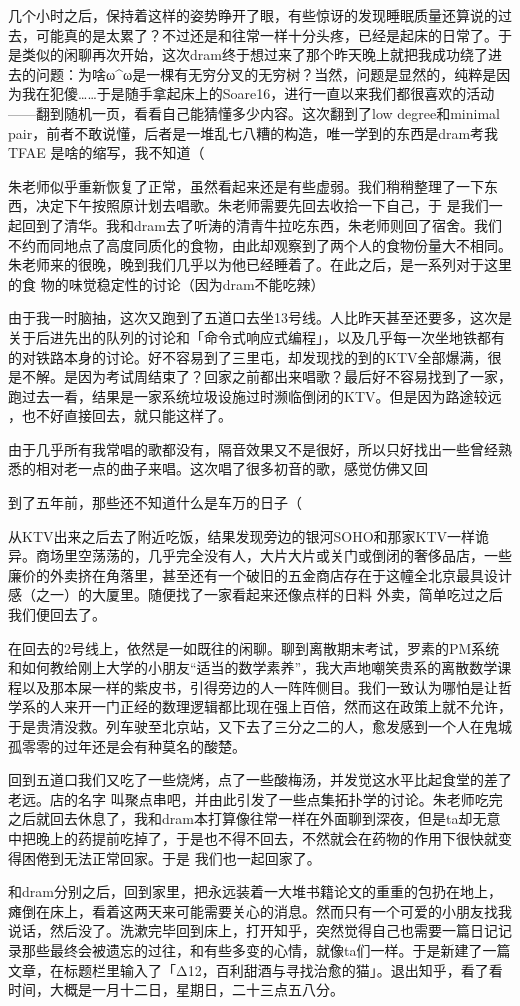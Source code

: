 \documentclass{article}
\begin{document}
几个小时之后，保持着这样的姿势睁开了眼，有些惊讶的发现睡眠质量还算说的过去，可能真的是太累了？不过还是和往常一样十分头疼，已经是起床的日常了。于是类似的闲聊再次开始，这次dram终于想过来了那个昨天晚上就把我成功绕了进去的问题：为啥ω^ω是一棵有无穷分叉的无穷树？当然，问题是显然的，纯粹是因为我在犯傻……于是随手拿起床上的Soare16，进行一直以来我们都很喜欢的活动——翻到随机一页，看看自己能猜懂多少内容。这次翻到了low degree和minimal pair，前者不敢说懂，后者是一堆乱七八糟的构造，唯一学到的东西是dram考我TFAE
是啥的缩写，我不知道（ 

朱老师似乎重新恢复了正常，虽然看起来还是有些虚弱。我们稍稍整理了一下东西，决定下午按照原计划去唱歌。朱老师需要先回去收拾一下自己，于
\newpage
是我们一起回到了清华。我和dram去了听涛的清青牛拉吃东西，朱老师则回了宿舍。我们不约而同地点了高度同质化的食物，由此却观察到了两个人的食物份量大不相同。朱老师来的很晚，晚到我们几乎以为他已经睡着了。在此之后，是一系列对于这里的食
物的味觉稳定性的讨论（因为dram不能吃辣） 

由于我一时脑抽，这次又跑到了五道口去坐13号线。人比昨天甚至还要多，这次是关于后进先出的队列的讨论和「命令式响应式编程」，以及几乎每一次坐地铁都有的对铁路本身的讨论。好不容易到了三里屯，却发现找的到的KTV全部爆满，很是不解。是因为考试周结束了？回家之前都出来唱歌？最后好不容易找到了一家，跑过去一看，结果是一家系统垃圾设施过时濒临倒闭的KTV。但是因为路途较远
，也不好直接回去，就只能这样了。 

由于几乎所有我常唱的歌都没有，隔音效果又不是很好，所以只好找出一些曾经熟悉的相对老一点的曲子来唱。这次唱了很多初音的歌，感觉仿佛又回

\newpage
到了五年前，那些还不知道什么是车万的日子（ 

从KTV出来之后去了附近吃饭，结果发现旁边的银河SOHO和那家KTV一样诡异。商场里空荡荡的，几乎完全没有人，大片大片或关门或倒闭的奢侈品店，一些廉价的外卖挤在角落里，甚至还有一个破旧的五金商店存在于这幢全北京最具设计感（之一）的大厦里。随便找了一家看起来还像点样的日料
外卖，简单吃过之后我们便回去了。 

在回去的2号线上，依然是一如既往的闲聊。聊到离散期末考试，罗素的PM系统和如何教给刚上大学的小朋友“适当的数学素养”，我大声地嘲笑贵系的离散数学课程以及那本屎一样的紫皮书，引得旁边的人一阵阵侧目。我们一致认为哪怕是让哲学系的人来开一门正经的数理逻辑都比现在强上百倍，然而这在政策上就不允许，于是贵清没救。列车驶至北京站，又下去了三分之二的人，愈发感到一个人在鬼城
孤零零的过年还是会有种莫名的酸楚。 

回到五道口我们又吃了一些烧烤，点了一些酸梅汤，并发觉这水平比起食堂的差了老远。店的名字
\newpage
叫聚点串吧，并由此引发了一些点集拓扑学的讨论。朱老师吃完之后就回去休息了，我和dram本打算像往常一样在外面聊到深夜，但是ta却无意中把晚上的药提前吃掉了，于是也不得不回去，不然就会在药物的作用下很快就变得困倦到无法正常回家。于是
我们也一起回家了。 

和dram分别之后，回到家里，把永远装着一大堆书籍论文的重重的包扔在地上，瘫倒在床上，看着这两天来可能需要关心的消息。然而只有一个可爱的小朋友找我说话，然后没了。洗漱完毕回到床上，打开知乎，突然觉得自己也需要一篇日记记录那些最终会被遗忘的过往，和有些多变的心情，就像ta们一样。于是新建了一篇文章，在标题栏里输入了「Δ12，百利甜酒与寻找治愈的猫」。退出知乎，看了看时间，大概是一月十二日，星期日，二十三点五八分。
\end{document}
